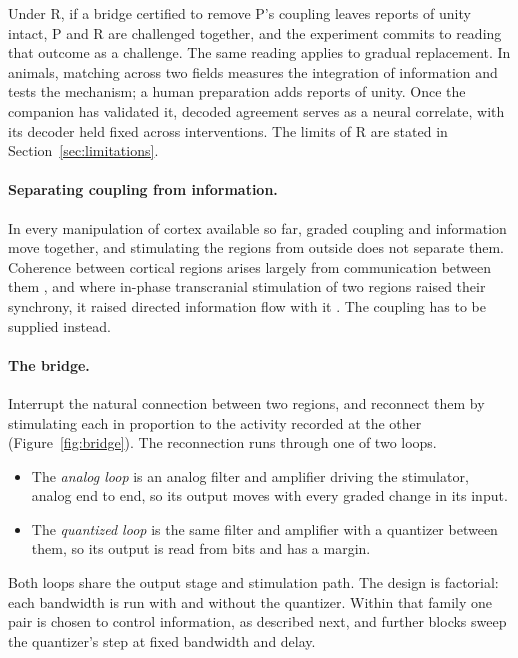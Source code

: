 \documentclass[12pt]{article}
\begin{document}
Under R, if a bridge certified to remove P's coupling leaves reports of unity
intact, P and R are challenged together, and the experiment commits to reading
that outcome as a challenge. The same reading applies to gradual replacement.
In animals, matching across two fields measures the integration of information
and tests the mechanism; a human preparation adds reports of unity. Once the
companion has validated it, decoded agreement serves as a neural correlate,
with its decoder held fixed across interventions. The limits of R are stated in
Section~\ref{sec:limitations}.

\paragraph{Separating coupling from information.} In every manipulation of
cortex available so far, graded coupling and information move together, and
stimulating the regions from outside does not separate them. Coherence between cortical regions arises
largely from communication between them \citep{schneider2021}, and where
in-phase transcranial stimulation of two regions raised their synchrony, it
raised directed information flow with it \citep{reinhart2019}. The coupling has
to be supplied instead.

\paragraph{The bridge.} Interrupt the natural connection between two regions,
and reconnect them by stimulating each in proportion to the activity recorded at
the other (Figure~\ref{fig:bridge}). The reconnection runs through one of two
loops.
\begin{itemize}
\item The \emph{analog loop} is an analog filter and amplifier driving the
stimulator, analog end to end, so its output moves with every graded change in
its input.
\item The \emph{quantized loop} is the same filter and amplifier with a quantizer
between them, so its output is read from bits and has a margin.
\end{itemize}
Both loops share the output stage and stimulation path. The design is
factorial: each bandwidth is run with and without the quantizer. Within that
family one pair is chosen to control information, as described next, and
further blocks sweep the quantizer's step at fixed bandwidth and delay.
\end{document}
